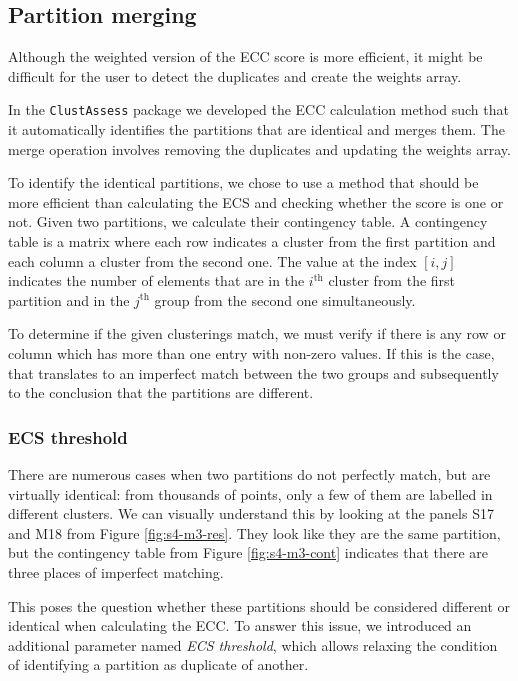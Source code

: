 \subsection{Partition merging} \label{sec:part-merge}
Although the weighted version of the ECC score is more efficient, it might be difficult for the user to detect the duplicates and create the weights array.

In the \verb|ClustAssess| package we developed the ECC calculation method such that it automatically identifies the partitions that are identical and merges them. The merge operation involves removing the duplicates and updating the weights array.

To identify the identical partitions, we chose to use a method that should be more efficient than calculating the ECS and checking whether the score is one or not. Given two partitions, we calculate their contingency table. A contingency table is a matrix where each row indicates a cluster from the first partition and each column a cluster from the second one. The value at the index $[i, j]$ indicates the number of elements that are in the $i^\text{th}$ cluster from the first partition and in the $j^\text{th}$ group from the second one simultaneously.

To determine if the given clusterings match, we must verify if there is any row or column which has more than one entry with non-zero values. If this is the case, that translates to an imperfect match between the two groups and subsequently to the conclusion that the partitions are different.

\subsubsection{ECS threshold}
There are numerous cases when two partitions do not perfectly match, but are virtually identical: from thousands of points, only a few of them are labelled in different clusters. We can visually understand this by looking at the panels S17 and M18 from Figure \ref{fig:s4-m3-res}. They look like they are the same partition, but the contingency table from Figure \ref{fig:s4-m3-cont} indicates that there are three places of imperfect matching.

This poses the question whether these partitions should be considered different or identical when calculating the ECC. To answer this issue, we introduced an additional parameter named \textit{ECS threshold}, which allows relaxing the condition of identifying a partition as duplicate of another.

